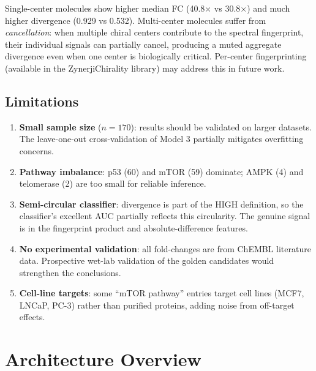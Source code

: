 \documentclass[11pt,a4paper]{article}
\begin{document}
Single-center molecules show higher median FC (40.8$\times$ vs 30.8$\times$)
and much higher divergence (0.929 vs 0.532). Multi-center molecules suffer
from \emph{cancellation}: when multiple chiral centers contribute to the
spectral fingerprint, their individual signals can partially cancel,
producing a muted aggregate divergence even when one center is biologically
critical. Per-center fingerprinting (available in the ZynerjiChirality
library) may address this in future work.

\subsection{Limitations}

\begin{enumerate}[nosep]
    \item \textbf{Small sample size} ($n = 170$): results should be validated
          on larger datasets. The leave-one-out cross-validation of Model 3
          partially mitigates overfitting concerns.
    \item \textbf{Pathway imbalance}: p53 (60) and mTOR (59) dominate;
          AMPK (4) and telomerase (2) are too small for reliable inference.
    \item \textbf{Semi-circular classifier}: divergence is part of the HIGH
          definition, so the classifier's excellent AUC partially reflects
          this circularity. The genuine signal is in the fingerprint product
          and absolute-difference features.
    \item \textbf{No experimental validation}: all fold-changes are from
          ChEMBL literature data. Prospective wet-lab validation of the
          golden candidates would strengthen the conclusions.
    \item \textbf{Cell-line targets}: some ``mTOR pathway'' entries target
          cell lines (MCF7, LNCaP, PC-3) rather than purified proteins,
          adding noise from off-target effects.
\end{enumerate}

\section{Architecture Overview}
\end{document}
